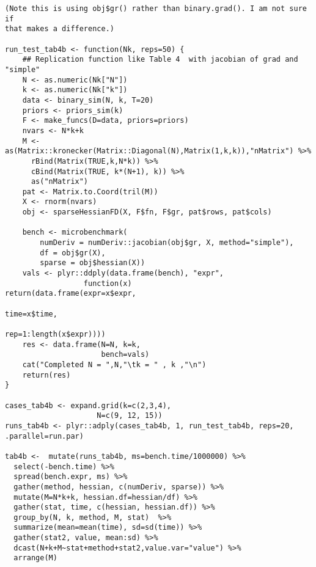 \documentclass{article}
\newenvironment{revQuote}{\itshape}{\vspace{\baselineskip}}
\begin{document}
\begin{enumerate}
\begin{revQuote}
\begin{verbatim}
(Note this is using obj$gr() rather than binary.grad(). I am not sure if
that makes a difference.)

run_test_tab4b <- function(Nk, reps=50) {
    ## Replication function like Table 4  with jacobian of grad and
"simple"
    N <- as.numeric(Nk["N"])
    k <- as.numeric(Nk["k"])
    data <- binary_sim(N, k, T=20)
    priors <- priors_sim(k)
    F <- make_funcs(D=data, priors=priors)
    nvars <- N*k+k
    M <-
as(Matrix::kronecker(Matrix::Diagonal(N),Matrix(1,k,k)),"nMatrix") %>%
      rBind(Matrix(TRUE,k,N*k)) %>%
      cBind(Matrix(TRUE, k*(N+1), k)) %>%
      as("nMatrix")
    pat <- Matrix.to.Coord(tril(M))
    X <- rnorm(nvars)
    obj <- sparseHessianFD(X, F$fn, F$gr, pat$rows, pat$cols)

    bench <- microbenchmark(
        numDeriv = numDeriv::jacobian(obj$gr, X, method="simple"), 
        df = obj$gr(X),
        sparse = obj$hessian(X))
    vals <- plyr::ddply(data.frame(bench), "expr",
                  function(x)
return(data.frame(expr=x$expr,
                                               
time=x$time,
                                               
rep=1:length(x$expr))))
    res <- data.frame(N=N, k=k,
                      bench=vals)
    cat("Completed N = ",N,"\tk = " , k ,"\n")
    return(res)
}

cases_tab4b <- expand.grid(k=c(2,3,4),
                     N=c(9, 12, 15))
runs_tab4b <- plyr::adply(cases_tab4b, 1, run_test_tab4b, reps=20,
.parallel=run.par)

tab4b <-  mutate(runs_tab4b, ms=bench.time/1000000) %>%
  select(-bench.time) %>%
  spread(bench.expr, ms) %>%
  gather(method, hessian, c(numDeriv, sparse)) %>%
  mutate(M=N*k+k, hessian.df=hessian/df) %>%
  gather(stat, time, c(hessian, hessian.df)) %>%
  group_by(N, k, method, M, stat)  %>%
  summarize(mean=mean(time), sd=sd(time)) %>%
  gather(stat2, value, mean:sd) %>%
  dcast(N+k+M~stat+method+stat2,value.var="value") %>%
  arrange(M)


\end{verbatim}
\end{revQuote}
\end{enumerate}
\end{document}
